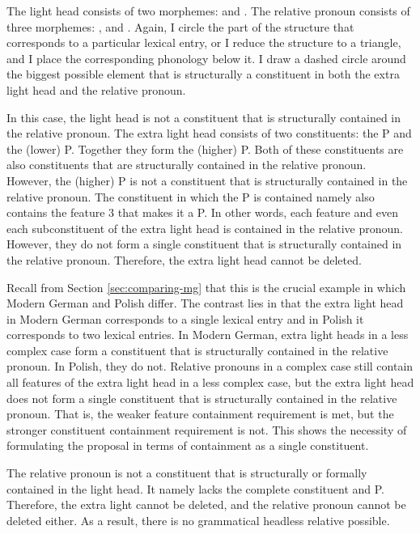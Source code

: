 The light head consists of two morphemes:  and .
The relative pronoun consists of three morphemes: ,  and .
Again, I circle the part of the structure that corresponds to a particular lexical entry, or I reduce the structure to a triangle, and I place the corresponding phonology below it.
I draw a dashed circle around the biggest possible element that is structurally a constituent in both the extra light head and the relative pronoun.

In this case, the light head is not a constituent that is structurally contained in the relative pronoun.
The extra light head consists of two constituents: the P and the (lower) P. Together they form the (higher) P.
Both of these constituents are also constituents that are structurally contained in the relative pronoun. However, the (higher) P is not a constituent that is structurally contained in the relative pronoun. The constituent in which the P is contained namely also contains the feature 3 that makes it a P.
In other words, each feature and even each subconstituent of the extra light head is contained in the relative pronoun. However, they do not form a single constituent that is structurally contained in the relative pronoun. Therefore, the extra light head cannot be deleted.

Recall from Section \ref{sec:comparing-mg} that this is the crucial example in which Modern German and Polish differ. The contrast lies in that the extra light head in Modern German corresponds to a single lexical entry and in Polish it corresponds to two lexical entries.
In Modern German, extra light heads in a less complex case form a constituent that is structurally contained in the relative pronoun.
In Polish, they do not.
Relative pronouns in a complex case still contain all features of the extra light head in a less complex case, but the extra light head does not form a single constituent that is structurally contained in the relative pronoun. That is, the weaker feature containment requirement is met, but the stronger constituent containment requirement is not. This shows the necessity of formulating the proposal in terms of containment as a single constituent.

The relative pronoun is not a constituent that is structurally or formally contained in the light head. It namely lacks the complete constituent and P.
Therefore, the extra light cannot be deleted, and the relative pronoun cannot be deleted either.
As a result, there is no grammatical headless relative possible.

